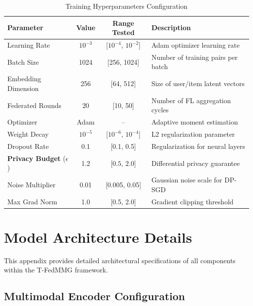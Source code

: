 \documentclass[12pt,a4paper]{report}
\begin{document}
{\begin{table}[htbp]
\centering
\small
\caption{Training Hyperparameters Configuration}
\label{tab:hyperparameters}
\begin{tabular}{lccl}
\toprule
\textbf{Parameter} & \textbf{Value} & \textbf{Range Tested} & \textbf{Description} \\
\midrule
Learning Rate       & $10^{-3}$ & [$10^{-4}$, $10^{-2}$] & Adam optimizer learning rate \\
Batch Size          & 1024      & [256, 1024]            & Number of training pairs per batch \\
Embedding Dimension & 256       & [64, 512]              & Size of user/item latent vectors \\
Federated Rounds    & 20        & [10, 50]               & Number of FL aggregation cycles \\
Optimizer           & Adam      & --                     & Adaptive moment estimation \\
Weight Decay        & $10^{-5}$ & [$10^{-6}$, $10^{-4}$] & L2 regularization parameter \\
Dropout Rate        & 0.1       & [0.1, 0.5]             & Regularization for neural layers \\
\midrule
\textbf{Privacy Budget} ($\epsilon$) & 1.2 & [$0.5$, $2.0$] & Differential privacy guarantee \\
Noise Multiplier    & 0.01      & [0.005, 0.05]          & Gaussian noise scale for DP-SGD \\
Max Grad Norm       & 1.0       & [0.5, 2.0]             & Gradient clipping threshold \\
\bottomrule
\end{tabular}
\end{table}

\chapter{Model Architecture Details}
\label{appendix:architecture}

This appendix provides detailed architectural specifications of all components within the T-FedMMG framework.

\section{Multimodal Encoder Configuration}

}
\end{document}
